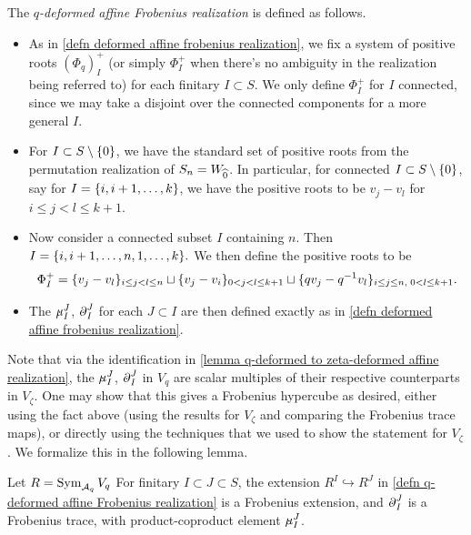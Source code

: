 \begin{defn}\label{defn q-deformed affine Frobenius realization}
The \emph{$q$-deformed affine Frobenius realization} is defined as follows.
\begin{itemize}
\item As in \cref{defn deformed affine frobenius realization}, we fix a system of positive roots $(\Phi_q)_I^+$ (or simply $\Phi_I^+$ when there's no ambiguity in the realization being referred to) for each finitary $I \subset S$.
We only define $\Phi_I^+$ for $I$ connected, since we may take a disjoint over the connected components for a more general $I$.

\item For $I \subset S \setminus \{0\}$, we have the standard set of positive roots from the permutation realization of $S_n=W_{\widehat{0}}$.
In particular, for connected $I \subset S \setminus\{0\}$, say for $I=\{i,i+1, \ldots, k\}$, we have the positive roots to be $v_j-v_l$ for $i\leq j < l\leq k+1$.

\item Now consider a connected subset $I$ containing $n$. Then $I=\{i, i+1, \ldots, n, 1,\ldots,k\}.$ 
We then define the positive roots to be 
$$\Phi_I^+=\{v_j-v_l\}_{i\leq j<l\leq n}\sqcup \{v_j-v_i\}_{0<j<l\leq k+1}\sqcup \{qv_j-q^{-1}v_l\}_{i \leq j\leq n,\; 0<l\leq k+1}.$$
\item The $\procopdtq_I^J$, $\ddq_I^J$ for each $J \subset I$ are then defined exactly as in \cref{defn deformed affine frobenius realization}.
\end{itemize}
\end{defn}

Note that via the identification in \cref{lemma q-deformed to zeta-deformed affine realization}, the $\procopdtq_I^J$, $\ddq_I^J$ in $V_q$ are scalar multiples of their respective counterparts in $V_\zeta$.
One may show that this gives a Frobenius hypercube as desired, either using the fact above (using the results for $V_\zeta$ and comparing the Frobenius trace maps), or directly using the techniques that we used to show the statement for $V_\zeta$.
We formalize this in the following lemma.
\begin{lemma}
    Let $R=\operatorname{Sym}_{\mathcal{A}_q}V_q$ For finitary $I\subset J \subset S$, the extension $R^I \hookrightarrow R^J$ in \cref{defn q-deformed affine Frobenius realization} is a Frobenius extension, and $\ddq_I^J$ is a Frobenius trace, with product-coproduct element $\procopdtq_I^J$.
\end{lemma}

